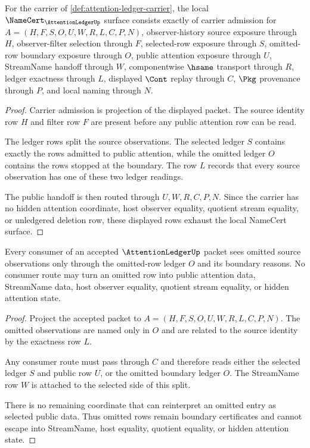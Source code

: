 \begin{theorem}
\label{thm:attention-ledger-namecert-obligations}
For the carrier of \autoref{def:attention-ledger-carrier}, the local $\NameCert_{\AttentionLedgerUp}$ surface consists exactly of carrier admission for $A=(H,F,S,O,U,W,R,L,C,P,N)$, observer-history source exposure through $H$, observer-filter selection through $F$, selected-row exposure through $S$, omitted-row boundary exposure through $O$, public attention exposure through $U$, StreamName handoff through $W$, componentwise $\hsame$ transport through $R$, ledger exactness through $L$, displayed $\Cont$ replay through $C$, $\Pkg$ provenance through $P$, and local naming through $N$.
\end{theorem}
\begin{proof}
Carrier admission is projection of the displayed packet. The source identity row $H$ and filter row $F$ are present before any public attention row can be read.

The ledger rows split the source observations. The selected ledger $S$ contains exactly the rows admitted to public attention, while the omitted ledger $O$ contains the rows stopped at the boundary. The row $L$ records that every source observation has one of these two ledger readings.

The public handoff is then routed through $U,W,R,C,P,N$. Since the carrier has no hidden attention coordinate, host observer equality, quotient stream equality, or unledgered deletion row, these displayed rows exhaust the local NameCert surface.
\end{proof}

\begin{theorem}
\label{thm:attention-ledger-non-escape}
Every consumer of an accepted $\AttentionLedgerUp$ packet sees omitted source observations only through the omitted-row ledger $O$ and its boundary reasons. No consumer route may turn an omitted row into public attention data, StreamName data, host observer equality, quotient stream equality, or hidden attention state.
\end{theorem}
\begin{proof}
Project the accepted packet to $A=(H,F,S,O,U,W,R,L,C,P,N)$. The omitted observations are named only in $O$ and are related to the source identity by the exactness row $L$.

Any consumer route must pass through $C$ and therefore reads either the selected ledger $S$ and public row $U$, or the omitted boundary ledger $O$. The StreamName row $W$ is attached to the selected side of this split.

There is no remaining coordinate that can reinterpret an omitted entry as selected public data. Thus omitted rows remain boundary certificates and cannot escape into StreamName, host equality, quotient equality, or hidden attention state.
\end{proof}

